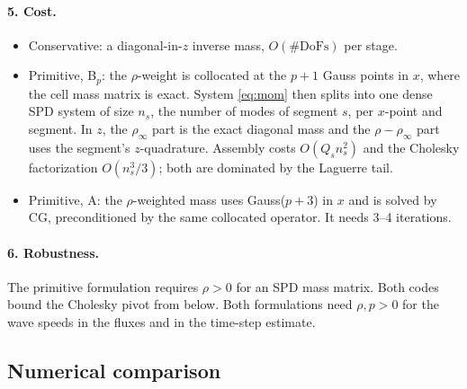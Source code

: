 \documentclass[11pt,a4paper]{article}
\begin{document}
\paragraph{5. Cost.}
\begin{itemize}
\item Conservative: a diagonal-in-$z$ inverse mass, $O(\#\text{DoFs})$ per stage.
\item Primitive, B$_p$\label{sec:primitive-impl}: the $\rho$-weight is collocated at
  the $p+1$ Gauss points in $x$, where the cell mass matrix is exact. System
  \eqref{eq:mom} then splits into one dense SPD system of size $n_s$, the number of
  modes of segment $s$, per $x$-point and segment. In $z$, the $\rho_\infty$ part is
  the exact diagonal mass and the $\rho-\rho_\infty$ part uses the segment's
  $z$-quadrature. Assembly costs $O(Q_s n_s^2)$ and the Cholesky factorization
  $O(n_s^3/3)$; both are dominated by the Laguerre tail.
\item Primitive, A: the $\rho$-weighted mass uses Gauss($p+3$) in $x$ and is solved by
  CG, preconditioned by the same collocated operator. It needs 3--4 iterations.
\end{itemize}

\paragraph{6. Robustness.}
The primitive formulation requires $\rho>0$ for an SPD mass matrix. Both codes bound
the Cholesky pivot from below. Both formulations need $\rho,p>0$ for the wave speeds
in the fluxes and in the time-step estimate.

\subsection{Numerical comparison}\label{sec:num-vars}
\end{document}
